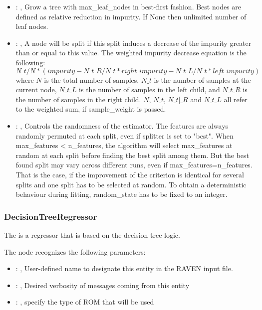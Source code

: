 \begin{itemize}
    \item {}: , 
      Grow a tree with max\_leaf\_nodes in best-first fashion. Best nodes are defined as relative
      reduction                                                  in impurity. If None then unlimited
      number of leaf nodes.

    \item {}: , 
      A node will be split if this split induces a decrease of the impurity greater than or equal to
      this value.                                                  The weighted impurity decrease
      equation is the following:                                                  $N\_t / N *
      (impurity - N\_t\_R / N\_t * right\_impurity - N\_t\_L / N\_t * left\_impurity)$
      where $N$ is the total number of samples, $N\_t$ is the number of samples at the current node,
      $N\_t\_L$ is the number                                                  of samples in the
      left child, and $N\_t\_R$ is the number of samples in the right child.
      $N$, $N\_t$, $N\_t]\_R$ and $N\_t\_L$ all refer to the weighted sum, if sample\_weight is
      passed.

    \item {}: , 
      Controls the randomness of the estimator. The features are
      always randomly permuted at each split, even if splitter is set to
      "best". When max\_features < n\_features, the algorithm will select
      max\_features at random at each split before finding the best split
      among them. But the best found split may vary across different runs,
      even if max\_features=n\_features. That is the case, if the improvement
      of the criterion is identical for several splits and one split has to
      be selected at random. To obtain a deterministic behaviour during
      fitting, random\_state has to be fixed to an integer.
  \end{itemize}


\subsubsection{DecisionTreeRegressor}
  The  is a regressor that is based on the
  decision tree logic.                          

  The  node recognizes the following parameters:
    \begin{itemize}
      \item {}: , 
        User-defined name to designate this entity in the RAVEN input file.
      \item {}: , 
        Desired verbosity of messages coming from this entity
      \item {}: , 
        specify the type of ROM that will be used
  \end{itemize}

